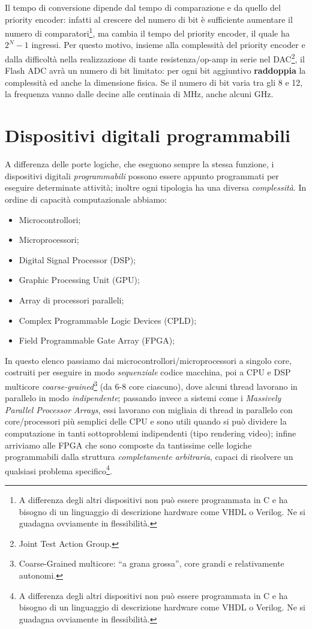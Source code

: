 \documentclass[
]{book}
\providecommand{\tightlist}{%
  \setlength{\itemsep}{0pt}\setlength{\parskip}{0pt}}
\begin{document}
Il tempo di conversione dipende dal tempo di comparazione e da quello
del priority encoder: infatti al crescere del numero di bit è
sufficiente aumentare il numero di comparatori\footnote{A differenza
  degli altri dispositivi non può essere programmata in C e ha bisogno
  di un linguaggio di descrizione hardware come VHDL o Verilog. Ne si
  guadagna ovviamente in flessibilità.}, ma cambia il tempo del priority
encoder, il quale ha \(2^N -1\) ingressi. Per questo motivo, insieme
alla complessità del priority encoder e dalla difficoltà nella
realizzazione di tante resistenza/op-amp in serie nel DAC\footnote{Joint
  Test Action Group.}, il Flash ADC avrà un numero di bit limitato: per
ogni bit aggiuntivo \textbf{raddoppia} la complessità ed anche la
dimensione fisica. Se il numero di bit varia tra gli 8 e 12, la
frequenza vanno dalle decine alle centinaia di MHz, anche alcuni GHz.

\chapter{Dispositivi digitali
programmabili}\label{dispositivi-digitali-programmabili}

A differenza delle porte logiche, che eseguono sempre la stessa
funzione, i dispositivi digitali \emph{programmabili} possono essere
appunto programmati per eseguire determinate attività; inoltre ogni
tipologia ha una diversa \emph{complessità}. In ordine di capacità
computazionale abbiamo:

\begin{itemize}
\tightlist
\item
  Microcontrollori;
\item
  Microprocessori;
\item
  Digital Signal Processor (DSP);
\item
  Graphic Processing Unit (GPU);
\item
  Array di processori paralleli;
\item
  Complex Programmable Logic Devices (CPLD);
\item
  Field Programmable Gate Array (FPGA);
\end{itemize}

In questo elenco passiamo dai microcontrollori/microprocessori a singolo
core, costruiti per eseguire in modo \emph{sequenziale} codice macchina,
poi a CPU e DSP multicore \emph{coarse-grained}\footnote{Coarse-Grained
  multicore: ``a grana grossa'', core grandi e relativamente autonomi.}
(da 6-8 core ciascuno), dove alcuni thread lavorano in parallelo in modo
\emph{indipendente}; passando invece a sistemi come i \emph{Massively
Parallel Processor Arrays}, essi lavorano con migliaia di thread in
parallelo con core/processori più semplici delle CPU e sono utili quando
si può dividere la computazione in tanti sottoproblemi indipendenti
(tipo rendering video); infine arriviamo alle FPGA che sono composte da
tantissime celle logiche programmabili dalla struttura
\emph{completamente arbitraria}, capaci di risolvere un qualsiasi
problema specifico\footnote{A differenza degli altri dispositivi non può
  essere programmata in C e ha bisogno di un linguaggio di descrizione
  hardware come VHDL o Verilog. Ne si guadagna ovviamente in
  flessibilità.}.
\end{document}
